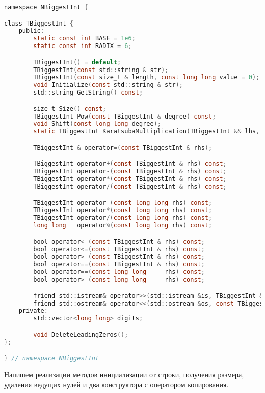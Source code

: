 \begin{lstlisting}[language=C]
namespace NBiggestInt {

class TBiggestInt {
    public:
        static const int BASE = 1e6; 
        static const int RADIX = 6;

        TBiggestInt() = default;
        TBiggestInt(const std::string & str);
        TBiggestInt(const size_t & length, const long long value = 0);
        void Initialize(const std::string & str);
        std::string GetString() const;

        size_t Size() const;
        TBiggestInt Pow(const TBiggestInt & degree) const;
        void Shift(const long long degree);
        static TBiggestInt KaratsubaMultiplication(TBiggestInt && lhs, TBiggestInt && rhs);

        TBiggestInt & operator=(const TBiggestInt & rhs);

        TBiggestInt operator+(const TBiggestInt & rhs) const;
        TBiggestInt operator-(const TBiggestInt & rhs) const;
        TBiggestInt operator*(const TBiggestInt & rhs) const;
        TBiggestInt operator/(const TBiggestInt & rhs) const;

        TBiggestInt operator-(const long long rhs) const;
        TBiggestInt operator*(const long long rhs) const;
        TBiggestInt operator/(const long long rhs) const;
        long long   operator%(const long long rhs) const;

        bool operator< (const TBiggestInt & rhs) const;
        bool operator<=(const TBiggestInt & rhs) const;
        bool operator> (const TBiggestInt & rhs) const;
        bool operator==(const TBiggestInt & rhs) const;
        bool operator==(const long long     rhs) const;
        bool operator> (const long long     rhs) const;

        friend std::istream& operator>>(std::istream &is, TBiggestInt & rhs);
        friend std::ostream& operator<<(std::ostream &os, const TBiggestInt & rhs);
    private:
        std::vector<long long> digits;

        void DeleteLeadingZeros();
};

} // namespace NBiggestInt
\end{lstlisting}

Напишем реализации методов инициализации от строки, получения размера, удаления ведущих нулей и два конструктора с оператором копирования. 

